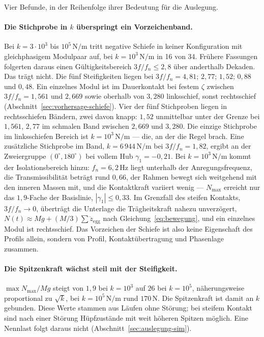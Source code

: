 \documentclass[12pt,a4paper]{report}
\begin{document}
Vier Befunde, in der Reihenfolge ihrer Bedeutung für die Auslegung.

\paragraph{Die Stichprobe in $k$ überspringt ein Vorzeichenband.}
Bei $k = 3\cdot10^{3}$ bis $10^{5}\,\mathrm{N/m}$ tritt negative Schiefe
in keiner Konfiguration mit gleichphasigem Modulpaar auf, bei
$k = 10^{3}\,\mathrm{N/m}$ in 16 von 34. Frühere Fassungen folgerten
daraus einen Gültigkeitsbereich $3f/f_n \leq 2{,}8$ über anderthalb
Dekaden. Das trägt nicht. Die fünf Steifigkeiten liegen bei
$3f/f_n = 4{,}81$; $2{,}77$; $1{,}52$; $0{,}88$ und $0{,}48$. Ein
einzelnes Modul ist im Dauerkontakt bei festem $\zeta$ zwischen
$3f/f_n = 1{,}561$ und $2{,}669$ sowie oberhalb von $3{,}280$
linksschief, sonst rechtsschief (Abschnitt~\ref{sec:vorhersage-schiefe}).
Vier der fünf Stichproben liegen in rechtsschiefen Bändern, zwei davon
knapp: $1{,}52$ unmittelbar unter der Grenze bei $1{,}561$, $2{,}77$ im
schmalen Band zwischen $2{,}669$ und $3{,}280$. Die einzige Stichprobe im
linksschiefen Bereich ist $k = 10^{3}\,\mathrm{N/m}$ --- die, an der die
Regel brach. Eine zusätzliche Stichprobe im Band,
$k = 6\,944\,\mathrm{N/m}$ bei $3f/f_n = 1{,}82$, ergibt an der
Zweiergruppe $(0^\circ, 180^\circ)$ bei vollem Hub $\gamma_1 = -0{,}21$.
Bei $k = 10^{3}\,\mathrm{N/m}$ kommt der Isolationsbereich hinzu:
$f_n = 6{,}2\,\mathrm{Hz}$ liegt unterhalb der Anregungsfrequenz, die
Transmissibilität beträgt rund $0{,}66$, der Rahmen bewegt sich
weitgehend mit den inneren Massen mit, und die Kontaktkraft variiert
wenig --- $N_{\max}$ erreicht nur das $1{,}9$-Fache der Basislinie,
$|\gamma_1| \leq 0{,}33$. Im Grenzfall des steifen Kontakts,
$3f/f_n \to 0$, überträgt die Unterlage die Trägheitskraft nahezu
unverzögert, $N(t) \approx Mg + (M/3)\sum \ddot{z}_{\mathrm{egg}}$ nach
Gleichung~\eqref{eq:bewegung}, und ein einzelnes Modul ist rechtsschief.
Das Vorzeichen der Schiefe ist also keine Eigenschaft des Profils allein,
sondern von Profil, Kontaktübertragung und Phasenlage zusammen.

\paragraph{Die Spitzenkraft wächst steil mit der Steifigkeit.}
$\max N_{\max}/Mg$ steigt von $1{,}9$ bei $k = 10^{3}$ auf $26$ bei
$k = 10^{5}$, näherungsweise proportional zu $\sqrt{k}$, bei
$k = 10^{5}\,\mathrm{N/m}$ rund $170\,\mathrm{N}$. Die Spitzenkraft ist
damit an $k$ gebunden. Diese Werte stammen aus Läufen ohne Störung; bei
steifem Kontakt sind nach einer Störung Hüpfzustände mit weit höheren
Spitzen möglich. Eine Nennlast folgt daraus nicht
(Abschnitt~\ref{sec:auslegung-sim}).
\end{document}
